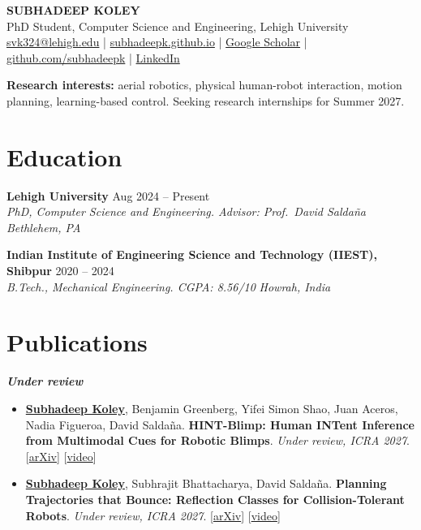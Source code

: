 \documentclass[11pt,letterpaper]{article}
\newcommand{\headfont}{\fontfamily{Merriwthr}\selectfont\bfseries}}
\newcommand{\entry}[4]{%
  \textbf{#1} \hfill #2 \\
  \textit{#3} \hfill \textit{#4}\par\vspace{1pt}}
\newcommand{\pub}[4]{%
  \item #1. \textbf{\color{black}#2}. \textit{#3}. #4}
\newcommand{\me}{\textbf{\underline{Subhadeep Koley}}}
\newcommand{\subhead}[1]{\vspace{3pt}\textit{\textbf{#1}}\par}
\begin{document}
\begin{center}
  {\LARGE \headfont SUBHADEEP KOLEY}\\[6pt]
  PhD Student, Computer Science and Engineering, Lehigh University\\[3pt]
  \href{mailto:svk324@lehigh.edu}{svk324@lehigh.edu} \;|\;
  \href{https://subhadeepk.github.io}{subhadeepk.github.io} \;|\;
  \href{https://scholar.google.com/citations?user=_b0J6xoAAAAJ&hl=en}{Google Scholar} \;|\;
  \href{https://github.com/subhadeepk}{github.com/subhadeepk} \;|\;
  \href{https://www.linkedin.com/in/subhadeep-koley-70251b1bb/}{LinkedIn}
\end{center}

\vspace{2pt}
{\color{bodygray}\textbf{Research interests:} aerial robotics, physical human-robot interaction, motion planning,
learning-based control. Seeking research internships for Summer 2027.}

\section{Education}

\entry{Lehigh University}{Aug 2024 -- Present}
      {PhD, Computer Science and Engineering. Advisor: Prof.\ David Salda\~na}{Bethlehem, PA}
\vspace{5pt}
\entry{Indian Institute of Engineering Science and Technology (IIEST), Shibpur}{2020 -- 2024}
      {B.Tech., Mechanical Engineering. CGPA: 8.56/10}{Howrah, India}

\section{Publications}

\subhead{Under review}
\begin{itemize}
  \pub{\me, Benjamin Greenberg, Yifei Simon Shao, Juan Aceros, Nadia Figueroa, David Salda\~na}
      {HINT-Blimp: Human INTent Inference from Multimodal Cues for Robotic Blimps}
      {Under review, ICRA 2027}
      {[\href{https://arxiv.org/abs/2609.27154}{arXiv}] [\href{https://youtu.be/b_QbHGdgBf4}{video}]}
  \pub{\me, Subhrajit Bhattacharya, David Salda\~na}
      {Planning Trajectories that Bounce: Reflection Classes for Collision-Tolerant Robots}
      {Under review, ICRA 2027}
      {[\href{https://arxiv.org/abs/2609.27145}{arXiv}] [\href{https://youtu.be/bygwxGIbFh4}{video}]}
\end{itemize}
\end{document}
